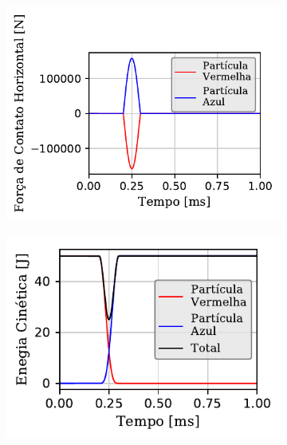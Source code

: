 \begin{figure}[H]
{		\begin{subfigure}[t]{\smallresultsfigwidth}
			\centering
			\includegraphics[scale=1]{images/colliding_spheres/conservative/contactForce-X_small.pdf}
			\caption{}
			\label{subfig:colliding_spheres:conservative:x_contact_force}
		\end{subfigure}
		\begin{subfigure}[t]{\smallresultsfigwidth}
			\centering
			\includegraphics[scale=1]{images/colliding_spheres/conservative/kineticEnergy_small_total.pdf}
			\caption{}
			\label{subfig:colliding_spheres:conservative:kinetic_energy}
		\end{subfigure}
		\begin{subfigure}[t]{\smallresultsfigwidth}
			\centering

\end{subfigure}}
\end{figure}
